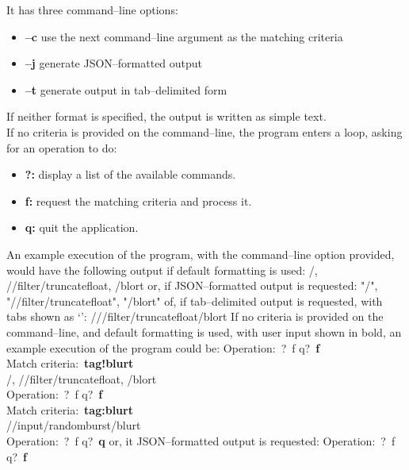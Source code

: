 It has three command--line options:
\begin{itemize}
\item \textbf{--c} use the next command--line argument as the matching criteria
\item \textbf{--j} generate JSON--formatted output
\item \textbf{--t} generate output in tab--delimited form
\end{itemize}
If neither format is specified, the output is written as simple text.\\

If no criteria is provided on the command--line, the program enters a loop, asking for an
operation to do:
\begin{itemize}
\item \textbf{?:} display a list of the available commands.
\item \textbf{f:} request the matching criteria and process it.
\item \textbf{q:} quit the application. 
\end{itemize}
An example execution of the program, with the command--line option
 provided, would have the following output if default formatting is
used:
\outputBegin{}
/\dollarService, /\serviceName/filter/truncatefloat, /blort
\outputEnd{}
or, if JSON--formatted output is requested:
\outputBegin{}
\openSq{} "/\dollarService", "/\serviceName/filter/truncatefloat", "/blort" \closeSq
\outputEnd{}
of, if tab--delimited output is requested, with tabs shown as
`\texttt{\boldmath{$\vdash$}}':
\outputBegin{}
/\dollarService\pseudotab/\serviceName/filter/truncatefloat\pseudotab/blort
\outputEnd{}
If no criteria is provided on the command--line, and default formatting is used, with
user input shown in bold, an example execution of the program could be:
\outputBegin{}
Operation:\ \openSq{}?\ f q\closeSq{}?\ \textbf{f}\\
Match criteria:\ \textbf{tag!blurt}\\
/\dollarService, /\serviceName/filter/truncatefloat, /blort\\
Operation:\ \openSq{}?\ f q\closeSq{}?\ \textbf{f}\\
Match criteria:\ \textbf{tag:blurt}\\
/\serviceName/input/randomburst/blurt\\
Operation:\ \openSq{}?\ f q\closeSq{}?\ \textbf{q}
\outputEnd{}
or, it JSON--formatted output is requested:
\outputBegin{}
Operation:\ \openSq{}?\ f q\closeSq{}?\ \textbf{f}\\
